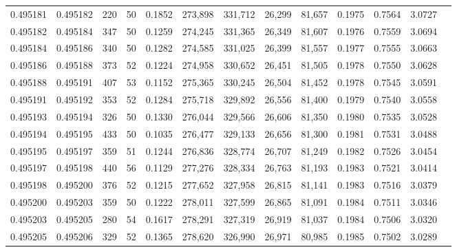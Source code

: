 \begin{tabular}{rrrrrrrrrrrrr}
0.495181 & 0.495182 &   220 &  50 &                                     0.1852 & 273,898 & 331,712 &  26,299 &  81,657 & 0.1975 & 0.7564 & 3.0727 \\
0.495182 & 0.495184 &   347 &  50 &                                     0.1259 & 274,245 & 331,365 &  26,349 &  81,607 & 0.1976 & 0.7559 & 3.0694 \\
0.495184 & 0.495186 &   340 &  50 &                                     0.1282 & 274,585 & 331,025 &  26,399 &  81,557 & 0.1977 & 0.7555 & 3.0663 \\
0.495186 & 0.495188 &   373 &  52 &                                     0.1224 & 274,958 & 330,652 &  26,451 &  81,505 & 0.1978 & 0.7550 & 3.0628 \\
0.495188 & 0.495191 &   407 &  53 &                                     0.1152 & 275,365 & 330,245 &  26,504 &  81,452 & 0.1978 & 0.7545 & 3.0591 \\
0.495191 & 0.495192 &   353 &  52 &                                     0.1284 & 275,718 & 329,892 &  26,556 &  81,400 & 0.1979 & 0.7540 & 3.0558 \\
0.495193 & 0.495194 &   326 &  50 &                                     0.1330 & 276,044 & 329,566 &  26,606 &  81,350 & 0.1980 & 0.7535 & 3.0528 \\
0.495194 & 0.495195 &   433 &  50 &                                     0.1035 & 276,477 & 329,133 &  26,656 &  81,300 & 0.1981 & 0.7531 & 3.0488 \\
0.495195 & 0.495197 &   359 &  51 &                                     0.1244 & 276,836 & 328,774 &  26,707 &  81,249 & 0.1982 & 0.7526 & 3.0454 \\
0.495197 & 0.495198 &   440 &  56 &                                     0.1129 & 277,276 & 328,334 &  26,763 &  81,193 & 0.1983 & 0.7521 & 3.0414 \\
0.495198 & 0.495200 &   376 &  52 &                                     0.1215 & 277,652 & 327,958 &  26,815 &  81,141 & 0.1983 & 0.7516 & 3.0379 \\
0.495200 & 0.495203 &   359 &  50 &                                     0.1222 & 278,011 & 327,599 &  26,865 &  81,091 & 0.1984 & 0.7511 & 3.0346 \\
0.495203 & 0.495205 &   280 &  54 &                                     0.1617 & 278,291 & 327,319 &  26,919 &  81,037 & 0.1984 & 0.7506 & 3.0320 \\
0.495205 & 0.495206 &   329 &  52 &                                     0.1365 & 278,620 & 326,990 &  26,971 &  80,985 & 0.1985 & 0.7502 & 3.0289 \\

\end{tabular}
